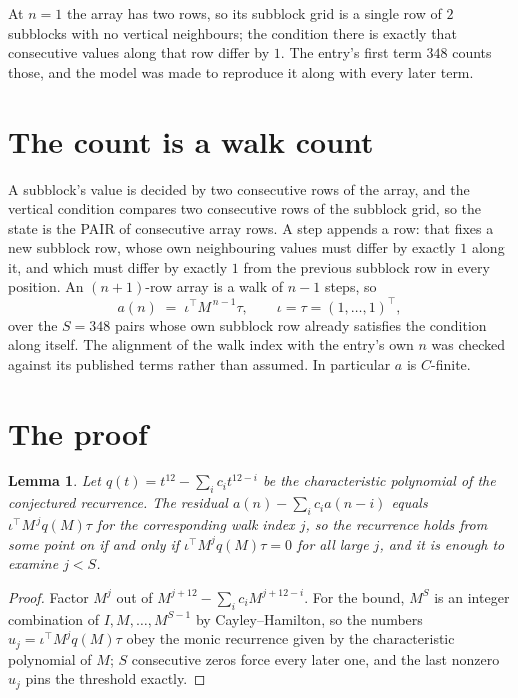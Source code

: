 \documentclass[11pt,a4paper]{article}
\theoremstyle{plain}
\newtheorem{lemma}[theorem]{Lemma}
\theoremstyle{definition}
\begin{document}
At $n=1$ the array has two rows, so its subblock grid is a single row of $2$ subblocks with
no vertical neighbours; the condition there is exactly that consecutive values along that row
differ by $1$. The entry's first term $348$ counts those, and the model was made to
reproduce it along with every later term.

\section{The count is a walk count}

A subblock's value is decided by two consecutive rows of the array, and the
vertical condition compares two consecutive rows of the subblock grid, so the state is the
PAIR of consecutive array rows. A step appends a row: that fixes a new subblock row, whose own
neighbouring values must differ by exactly $1$ along it, and which must differ by exactly
$1$ from the previous subblock row in every position. An $(n+1)$-row array is a walk of
$n-1$ steps, so
\[
a(n)\;=\;\iota^{\!\top}M^{\,n-1}\tau,\qquad\iota=\tau=(1,\dots,1)^{\!\top},
\]
over the $S=348$ pairs whose own subblock row already satisfies the condition along itself.
The alignment of the walk index with the entry's own $n$ was checked against its published
terms rather than assumed. In particular $a$ is $C$-finite.

\section{The proof}

\begin{lemma}\label{lem:crit}
Let $q(t)=t^{12}-\sum_i c_it^{12-i}$ be the characteristic polynomial of the
conjectured recurrence. The residual $a(n)-\sum_ic_ia(n-i)$ equals
$\iota^{\!\top}M^{\,j}q(M)\tau$ for the corresponding walk index $j$, so the recurrence
holds from some point on if and only if $\iota^{\!\top}M^{j}q(M)\tau=0$ for all large $j$,
and it is enough to examine $j<S$.
\end{lemma}

\begin{proof}
Factor $M^{j}$ out of $M^{j+12}-\sum_ic_iM^{j+12-i}$. For the bound, $M^{S}$
is an integer combination of $I,M,\dots,M^{S-1}$ by Cayley--Hamilton, so the numbers
$u_j=\iota^{\!\top}M^{j}q(M)\tau$ obey the monic recurrence given by the characteristic
polynomial of $M$; $S$ consecutive zeros force every later one, and the last nonzero $u_j$
pins the threshold exactly.
\end{proof}
\end{document}
